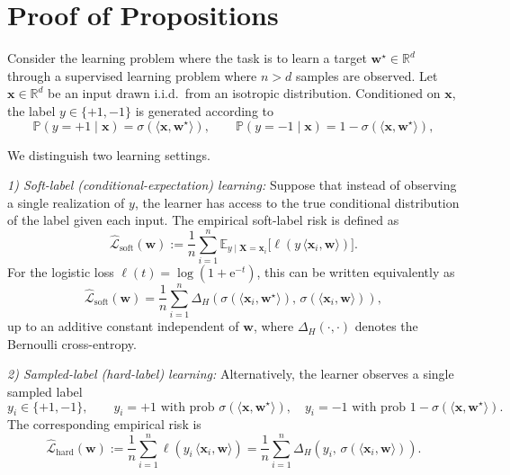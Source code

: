 \documentclass{article}
\theoremstyle{plain}
\theoremstyle{definition}
\theoremstyle{remark}
\begin{document}
{\section{Proof of Propositions}

Consider the learning problem where the task is to learn a target $\mathbf{w}^{\star}\in \mathbb{R}^d$ through a supervised learning problem where $n>d$ samples are observed. 
Let $\boldsymbol x \in \mathbb R^d$ be an input drawn i.i.d.\ from an isotropic distribution. Conditioned on $\boldsymbol x$, the label $y \in \{+1,-1\}$ is generated according to
\[
\mathbb P(y=+1 \mid \boldsymbol x) = \sigma(\langle \boldsymbol x, \boldsymbol w^\star\rangle),
\qquad
\mathbb P(y=-1 \mid \boldsymbol x) = 1 - \sigma(\langle \boldsymbol x, \boldsymbol w^\star\rangle),
\]

We distinguish two learning settings.

\textit{1) Soft-label (conditional-expectation) learning:}
Suppose that instead of observing a single realization of $y$, the learner has access to the
true conditional distribution of the label given each input.
The empirical soft-label risk is defined as
\begin{equation}
\widehat{\mathcal L}_{\mathrm{soft}}(\boldsymbol w)
:=
\frac{1}{n}\sum_{i=1}^n
\mathbb E_{y \mid \boldsymbol X=\boldsymbol x_i}
\big[
\ell\!\left(y\,\langle \boldsymbol x_i,\boldsymbol w\rangle\right) 
\big].
\label{eq:soft-risk-def-restate}
\end{equation}
For the logistic loss $\ell(t)=\log(1+\mathrm e^{-t})$, this can be written equivalently as
\begin{equation}
\widehat{\mathcal L}_{\mathrm{soft}}(\boldsymbol w)
=
\frac{1}{n}\sum_{i=1}^n
\Delta_H\!\left(\sigma(\langle \boldsymbol x_{i}, \boldsymbol w^\star\rangle),\,\sigma(\langle \boldsymbol x_i,\boldsymbol w\rangle)\right),
\label{eq:soft-risk-deltaH}
\end{equation}
up to an additive constant independent of $\boldsymbol w$,
where $\Delta_H(\cdot,\cdot)$ denotes the Bernoulli cross-entropy.

\textit{2) Sampled-label (hard-label) learning:}
Alternatively, the learner observes a single sampled label
\[
y_i \in \{+1,-1\},
\qquad
y_i = +1 \text{ with prob\ } \sigma(\langle \boldsymbol x, \boldsymbol w^\star\rangle),
\quad
y_i = -1 \text{ with prob\ } 1-\sigma(\langle \boldsymbol x, \boldsymbol w^\star\rangle).
\]
The corresponding empirical risk is
\begin{equation}
\widehat{\mathcal L}_{\mathrm{hard}}(\boldsymbol w)
:=
\frac{1}{n}\sum_{i=1}^n
\ell\!\left(y_i\,\langle \boldsymbol x_i,\boldsymbol w\rangle\right)
=
\frac{1}{n}\sum_{i=1}^n
\Delta_H\!\left(y_i,\,\sigma(\langle \boldsymbol x_i,\boldsymbol w\rangle)\right).
\label{eq:hard-risk}
\end{equation}

}
\end{document}
